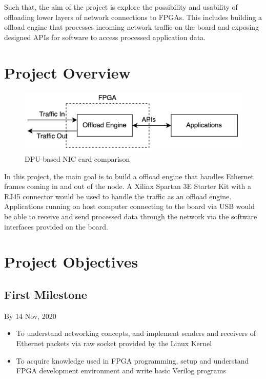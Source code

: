\documentclass[a4paper,11pt]{scrartcl}
\begin{document}
Such that, the aim of the project is explore the possibility and usability of offloading lower layers of network connections to FPGAs. This includes building a offload engine that processes incoming network traffic on the board and exposing designed APIs for software to access processed application data.

\section{Project Overview}
\begin{figure}[h]
    \includegraphics[width=\textwidth]{imgs/design.png}
    \caption{DPU-based NIC card comparison}
    \label{nic-comparison}
\end{figure}

In this project, the main goal is to build a offload engine that handles Ethernet frames coming in and out of the node. A Xilinx Spartan 3E Starter Kit with a RJ45 connector would be used to handle the traffic as an offload engine. Applications running on host computer connecting to the board via USB would be able to receive and send processed data through the network via the software interfaces provided on the board.

\section{Project Objectives}

\subsection{First Milestone}
By 14 Nov, 2020
\begin{itemize}
    \item To understand networking concepts, and implement senders and receivers of Ethernet packets via raw socket provided by the Linux Kernel
    \item To acquire knowledge used in FPGA programming, setup and understand FPGA development environment and write basic Verilog programs
\end{itemize}
\end{document}
